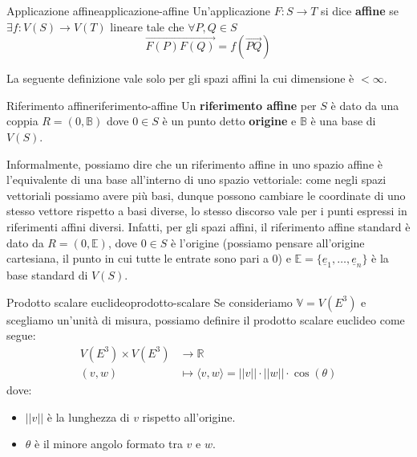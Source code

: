 \documentclass[12pt]{report}
\newcommand{\R}{\mathbb{R}}
\newcommand{\V}{\mathbb{V}}
\begin{document}
	\begin{definizione}{Applicazione affine}{applicazione-affine}
		Un'applicazione $F: S \to T$ si dice \textbf{affine} se $\exists f: V(S) \to V(T)$ lineare tale che $\forall P, Q \in S$
		\[
			\overrightarrow{F(P)F(Q)} = f(\overrightarrow{PQ})
		\]
	\end{definizione}
	
	La seguente definizione vale solo per gli spazi affini la cui dimensione è $< \infty$.
	\begin{definizione}{Riferimento affine}{riferimento-affine}
		Un \textbf{riferimento affine} per $S$ è dato da una coppia $R = (0, \mathbb{B})$ dove $0 \in S$ è un punto detto \textbf{origine} e $\mathbb{B}$ è una base di $V(S)$.
	\end{definizione}
	Informalmente, possiamo dire che un riferimento affine in uno spazio affine è l'equivalente di una base all'interno di uno spazio vettoriale: come negli spazi vettoriali possiamo avere più basi, dunque possono cambiare le coordinate di uno stesso vettore rispetto a basi diverse, lo stesso discorso vale per i punti espressi in riferimenti affini diversi. Infatti, per gli spazi affini, il riferimento affine standard è dato da $R = (0, \mathbb{E})$, dove $0 \in S$ è l'origine (possiamo pensare all'origine cartesiana, il punto in cui tutte le entrate sono pari a $0$) e $\mathbb{E} = \{\underline{e}_1, \dots, \underline{e}_n\}$ è la base standard di $V(S)$.
	
	\begin{definizione}{Prodotto scalare euclideo}{prodotto-scalare}
		Se consideriamo $\V = V(E^3)$ e scegliamo un'unità di misura, possiamo definire il prodotto scalare euclideo come segue:
		\[
			\begin{aligned}
				V(E^3) \times V(E^3) &\to \R\\
				(v, w) &\mapsto \langle v, w\rangle = ||v|| \cdot ||w|| \cdot \cos(\theta)
			\end{aligned}
		\]
		dove:
		\begin{itemize}
			\item $||v||$ è la lunghezza di $v$ rispetto all'origine.
			\item $\theta$ è il minore angolo formato tra $v$ e $w$.
		\end{itemize}
	\end{definizione}
	
	\newpage
\end{document}

